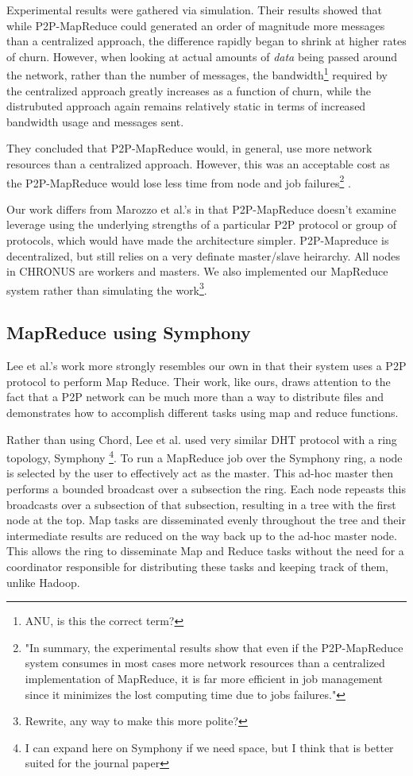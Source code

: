 \documentclass[conference, compsocconf, letterpaper]{IEEEtran}
\begin{document}
Experimental results were gathered via simulation. Their results showed that while P2P-MapReduce could generated an order of magnitude more messages than a centralized approach, the difference rapidly began to shrink at higher rates of churn.  However, when looking at actual amounts of \emph{data} being passed around the network, rather than the number of messages, the bandwidth\footnote{ANU, is this the correct term?} required by the centralized approach greatly increases as a function of churn, while the distrubuted approach again remains relatively static in terms of increased bandwidth usage and messages sent.  

They concluded that P2P-MapReduce would, in general, use more network resources than a centralized approach. However, this was an acceptable cost as the P2P-MapReduce would lose less time from node and job failures\footnote{"In summary, the experimental results show that even if the P2P-MapReduce system consumes in most cases more network resources than a centralized implementation of MapReduce, it is far more efficient in job management since it minimizes the lost computing time due to jobs failures."\cite{marozzo2012p2p}} \cite{marozzo2012p2p}.

Our work differs from Marozzo et al.'s in that P2P-MapReduce doesn't examine leverage using the underlying strengths of a particular P2P protocol or group of protocols, which would have made the architecture simpler.  P2P-Mapreduce is decentralized, but still relies on a very definate master/slave heirarchy.  All nodes in CHRONUS are workers and masters.  We also implemented our MapReduce system rather than simulating the work\footnote{Rewrite, any way to make this more polite?}.

\subsection{MapReduce using Symphony}
Lee et al.'s work more strongly resembles our own in that their system uses a P2P protocol to perform Map Reduce\cite{leemap}.  Their work, like ours, draws attention to the fact that a P2P network can be much more than a way to distribute files and demonstrates how to accomplish different tasks using map and reduce functions.

Rather than using Chord, Lee et al. used very similar DHT protocol with a ring topology, Symphony \cite{symphony}\footnote{I can expand here on Symphony if we need space, but I think that is better suited for the journal paper}.  To run a MapReduce job over the Symphony ring, a node is selected by the user to effectively act as the master.  This ad-hoc master then performs a bounded broadcast over a subsection the ring.  Each node repeasts this broadcasts over a subsection of that subsection, resulting in a tree with the first node at the top.  Map tasks are disseminated evenly throughout the tree and their intermediate results are reduced on the way back up to the ad-hoc master node.  This allows the ring to disseminate Map and Reduce tasks without the need for a coordinator responsible for distributing these tasks and keeping track of them, unlike Hadoop.
 
\end{document}
